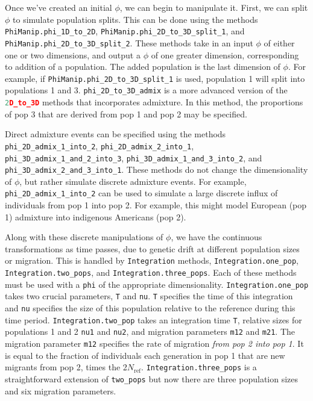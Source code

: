 \documentclass[12pt]{article}
\makeatletter
\newcommand{\Nref}{\ensuremath{N_\text{ref}}\xspace}
\newcommand{\py}[1]{\lstinline[language=Python, showstringspaces=False]@#1@}
\makeatother
\begin{document}
Once we've created an initial $\phi$, we can begin to manipulate it.
First, we can split $\phi$ to simulate population splits.
This can be done using the methods \py{PhiManip.phi_1D_to_2D}, \py{PhiManip.phi_2D_to_3D_split_1}, and \py{PhiManip.phi_2D_to_3D_split_2}.
These methods take in an input $\phi$ of either one or two dimensions, and output a $\phi$ of one greater dimension, corresponding to addition of a population.
The added population is the last dimension of $\phi$.
For example, if \py{PhiManip.phi_2D_to_3D_split_1} is used, population 1 will split into populations 1 and 3.
\py{phi_2D_to_3D_admix} is a more advanced version of the \py{2D_to_3D} methods that incorporates admixture.
In this method, the proportions of pop 3 that are derived from pop 1 and pop 2 may be specified.

Direct admixture events can be specified using the methods \py{phi_2D_admix_1_into_2}, \py{phi_2D_admix_2_into_1}, \py{phi_3D_admix_1_and_2_into_3}, \py{phi_3D_admix_1_and_3_into_2}, and \py{phi_3D_admix_2_and_3_into_1}.
These methods do not change the dimensionality of $\phi$, but rather simulate discrete admixture events.
For example, \py{phi_2D_admix_1_into_2} can be used to simulate a large discrete influx of individuals from pop 1 into pop 2.
For example, this might model European (pop 1) admixture into indigenous Americans (pop 2).

Along with these discrete manipulations of $\phi$, we have the continuous transformations as time passes, due to genetic drift at different population sizes or migration.
This is handled by \py{Integration} methods, \py{Integration.one_pop}, \py{Integration.two_pops}, and \py{Integration.three_pops}.
Each of these methods must be used with a \py{phi} of the appropriate dimensionality.
\py{Integration.one_pop} takes two crucial parameters, \py{T} and \py{nu}.
\py{T} specifies the time of this integration and \py{nu} specifies the size of this population relative to the reference during this time period.
\py{Integration.two_pop} takes an integration time \py{T}, relative sizes for populations 1 and 2 \py{nu1} and \py{nu2}, and migration parameters \py{m12} and \py{m21}.
The migration parameter \py{m12} specifies the rate of migration \emph{from pop 2 into pop 1}.
It is equal to the fraction of individuals each generation in pop 1 that are new migrants from pop 2, times the 2\Nref.
\py{Integration.three_pops} is a straightforward extension of \py{two_pops} but now there are three population sizes and six migration parameters.
\end{document}
